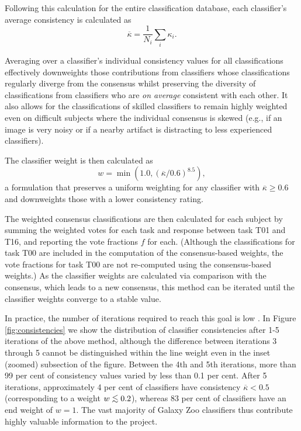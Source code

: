 \documentclass[useAMS,usenatbib]{mn2e}
\def\mkappamean {\overline{\kappa}}
\def\lesssim{\mathrel{\hbox{\rlap{\hbox{\lower3pt\hbox{$\sim$}}}\hbox{\raise2pt\hbox{$<$}}}}}
\begin{document}
{Following this calculation for the entire classification database, each classifier's average consistency is calculated as
\begin{equation}
\mkappamean = \frac{1}{N_i} \sum\limits_i \kappa_i .
\label{eqn-consistency-avg}
\end{equation}

Averaging over a classifier's individual consistency values for all classifications effectively downweights those contributions from classifiers whose classifications regularly diverge from the consensus whilst preserving the diversity of classifications from classifiers who are \emph{on average} consistent with each other. It also allows for the classifications of skilled classifiers to remain highly weighted even on difficult subjects where the individual consensus is skewed (e.g., if an image is very noisy or if a nearby artifact is distracting to less experienced classifiers). 

The classifier weight is then calculated as 
\begin{equation}
w = \min \left(1.0,(\mkappamean / 0.6)^{8.5} \right) ,
\label{eqn-weight}
\end{equation}
a formulation that preserves a uniform weighting for any classifier with $\mkappamean \geq 0.6$ and downweights those with a lower consistency rating.

The weighted consensus classifications are then calculated for each subject by summing the weighted votes for each task and response between task T01 and T16, and reporting the vote fractions $f$ for each. (Although the classifications for task T00 are included in the computation of the consensus-based weights, the vote fractions for task T00 are not re-computed using the consensus-based weights.) As the classifier weights are calculated via comparison with the consensus, which leads to a new consensus, this method can be iterated until the classifier weights converge to a stable value. 

In practice, the number of iterations required to reach this goal is low \citep[e.g., 3 or less in previous projects;][]{bamford09,willett13}. In Figure \ref{fig:consistencies} we show the distribution of classifier consistencies after 1-5 iterations of the above method, although the difference between iterations 3 through 5 cannot be distinguished within the line weight even in the inset (zoomed) subsection of the figure. Between the 4th and 5th iterations, more than 99 per cent of consistency values varied by less than 0.1 per cent. After 5 iterations, approximately 4 per cent of classifiers have consistency $\mkappamean < 0.5$ (corresponding to a weight $w \lesssim 0.2$), whereas 83 per cent of classifiers have an end weight of $w = 1$. The vast majority of Galaxy Zoo classifiers thus contribute highly valuable information to the project.

}
\end{document}
